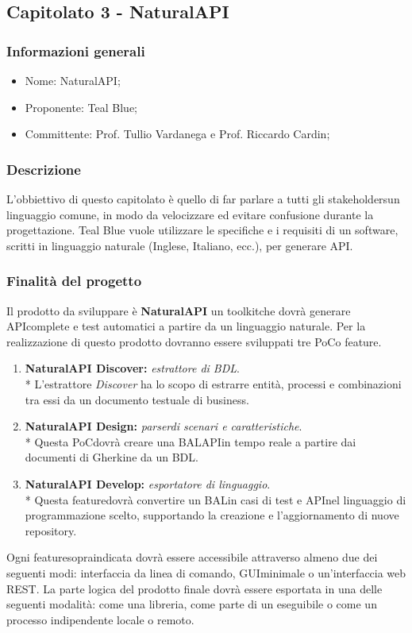\subsection{Capitolato 3 - NaturalAPI}
\subsubsection{Informazioni generali}
\begin{itemize}
	\item Nome: NaturalAPI;
	\item Proponente: Teal Blue;
	\item Committente: Prof. Tullio Vardanega e Prof. Riccardo Cardin;
\end{itemize}
\subsubsection{Descrizione}
L'obbiettivo di questo capitolato è quello di far parlare a tutti gli stakeholders\glo un linguaggio comune, in modo da velocizzare ed evitare confusione durante la progettazione. Teal Blue vuole utilizzare le specifiche e i requisiti di un software, scritti in linguaggio naturale (Inglese, Italiano, ecc.), per generare API\glo.
\subsubsection{Finalità del progetto}
Il prodotto da sviluppare è \textbf{NaturalAPI} un toolkit\glo che dovrà generare API\glo complete e test automatici a partire da un linguaggio naturale. Per la realizzazione di questo prodotto dovranno essere sviluppati tre PoC\glo o feature\glo.
\begin{enumerate}
	\item \textbf{NaturalAPI Discover: }\textit{estrattore di BDL\glo}. \\*
	L'estrattore \textit{Discover} ha lo scopo di estrarre entità, processi e combinazioni tra essi da un documento testuale di business.
	\item \textbf{NaturalAPI Design: }\textit{parser\glo di scenari e caratteristiche}. \\*
	Questa PoC\glo dovrà creare una BAL\glo API\glo in tempo reale a partire dai documenti di Gherkin\glo e da un BDL\glo.
	\item \textbf{NaturalAPI Develop: }\textit{esportatore di linguaggio}. \\* 
	Questa feature\glo dovrà convertire un BAL\glo in casi di test e API\glo nel linguaggio di programmazione scelto, supportando la creazione e l'aggiornamento di nuove repository\glo.
\end{enumerate} 
Ogni feature\glo sopraindicata dovrà essere accessibile attraverso almeno due dei seguenti modi: interfaccia da linea di comando, GUI\glo minimale o un'interfaccia web REST\glo.
La parte logica del prodotto finale dovrà essere esportata in una delle seguenti modalità: come una libreria, come parte di un eseguibile o come un processo indipendente locale o remoto.  


